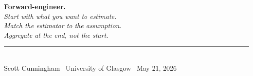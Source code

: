 \documentclass[aspectratio=169,11pt]{beamer}
\begin{document}
\begin{frame}[plain]
\centering
\vspace{2.5em}
{\Huge\bfseries\color{forest} Forward-engineer.}\\[1.5em]
{\Large\itshape\color{charcoal} Start with what you want to estimate.\\Match the estimator to the assumption.\\Aggregate at the end, not the start.}\\[2em]
\rule{0.4\textwidth}{0.6pt}\\[0.8em]
{\small\color{warmgray} Scott Cunningham \textperiodcentered\ University of Glasgow \textperiodcentered\ May 21, 2026}
\end{frame}
\end{document}
